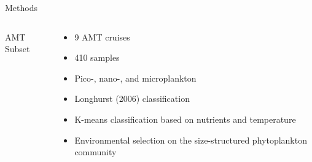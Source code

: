 \documentclass{beamer}
\begin{document}
\begin{frame}{Methods}

\begin{columns}[t]

\begin{column}{0.5\linewidth}

AMT Subset


\end{column}

\begin{column}{0.5\linewidth}

\begin{itemize}

\item 9 AMT cruises

\item 410 samples

\item Pico-, nano-, and microplankton

\item Longhurst (2006) classification

\item K-means classification based on nutrients and temperature

\item Environmental selection on the size-structured phytoplankton community 

\end{itemize}

\end{column}

\end{columns}

\end{frame}
\end{document}
